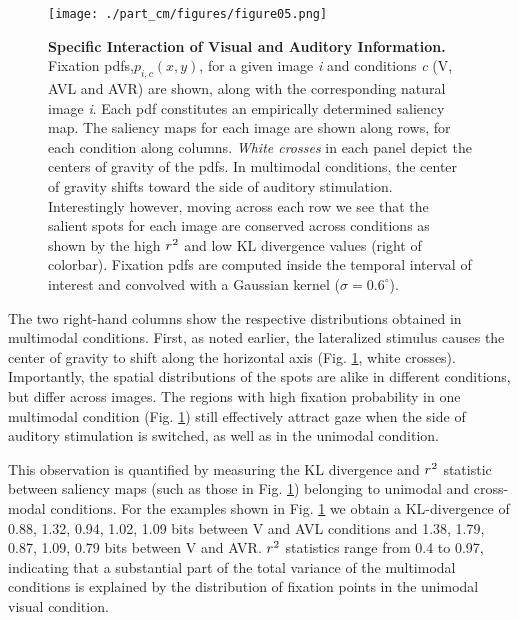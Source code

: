 \begin{figure}[!htb] \centerline{ \texttt{[image: ./part\_cm/figures/figure05.png]}} 

\caption[Specific Interaction of Visual and Auditory
Information.]{\textbf{Specific Interaction of Visual and Auditory
Information.} Fixation pdfs,$p_{i,c}(x,y)$, for a given image \textit{i}
and conditions \textit{c} (V, AVL and AVR) are shown, along with the
corresponding natural image \textit{i}. Each pdf constitutes an empirically
determined saliency map. The saliency maps for each image are shown along
rows, for each condition along columns. \textit{White crosses} in each
panel depict the centers of gravity of the pdfs. In multimodal conditions,
the center of gravity shifts toward the side of auditory stimulation.
Interestingly however, moving across each row we see that the salient spots
for each image are conserved across conditions as shown by the high
$r\textsuperscript{2}$ and low KL divergence values (right of colorbar).
Fixation pdfs are computed inside the temporal interval of interest and
convolved with a Gaussian kernel ($\sigma = 0.6^{\circ}$). }

\label{fig5}
\end{figure}

The two right-hand columns show the respective distributions obtained in
multimodal conditions. First, as noted earlier, the lateralized stimulus
causes the center of gravity to shift along the horizontal axis
(Fig. \ref{fig5}, white crosses). Importantly, the spatial distributions of the
spots are alike in different conditions, but differ across images. The
regions with high fixation probability in one multimodal condition
(Fig. \ref{fig5}) still effectively attract gaze when the side of auditory
stimulation is switched, as well as in the unimodal condition.

This observation is quantified by measuring the KL divergence and
$r\textsuperscript{2}$ statistic between saliency maps (such as those in
Fig. \ref{fig5}) belonging to unimodal and cross-modal conditions. For the
examples shown in Fig. \ref{fig5} we obtain a KL-divergence of 0.88, 1.32,
0.94, 1.02, 1.09 bits between V and AVL conditions and 1.38, 1.79, 0.87,
1.09, 0.79 bits between V and AVR. $r\textsuperscript{2}$ statistics range
from 0.4 to 0.97, indicating that a substantial part of the total variance
of the multimodal conditions is explained by the distribution of fixation
points in the unimodal visual condition. 

